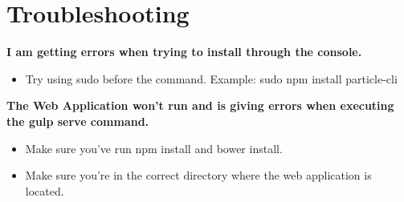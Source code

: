 \documentclass[a4paper,10pt]{article}
\begin{document}
	\newpage
	\section{Troubleshooting}
	\textbf{I am getting errors when trying to install through the console.}
	\begin{itemize}
		\item Try using sudo before the command. Example: sudo npm install particle-cli
	\end{itemize}
	
	\textbf{The Web Application won't run and is giving errors when executing the gulp serve command.} 
	\begin{itemize}
		\item Make sure you've run npm install and bower install.
		\item Make sure you're in the correct directory where the web application is located.
	\end{itemize}
\end{document}
